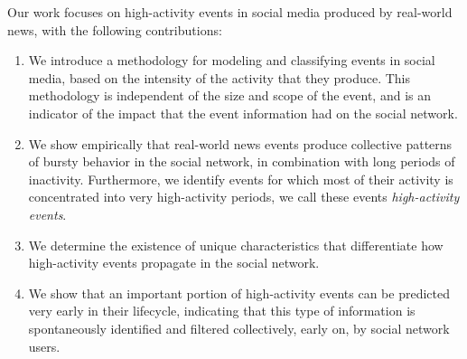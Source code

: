 \documentclass[10pt,letterpaper]{article}
\newcommand{\newtext}[1]{{\leavevmode\color{blue}#1}}
\begin{document}



Our work focuses on high-activity events in social media produced by
real-world news, with the following contributions:
\begin{enumerate}

\item We introduce a methodology for modeling and classifying
events in social media, based on the intensity of the activity that they
produce. This methodology is independent of the size and scope of the event,
and is an indicator of the impact that the event information had on the social network.

\item We show empirically that real-world news events produce collective
patterns of bursty behavior in the social network, in combination with long periods of
inactivity. Furthermore, we identify events for which most of their activity
is concentrated into very high-activity periods, we call these events {\em
high-activity events}.

\item We determine the existence of unique characteristics that
differentiate how high-activity events propagate in the social network.

\item We show that an important portion of high-activity events can be
predicted very early in their lifecycle, indicating that this type
of information is spontaneously identified and filtered collectively, early
on, by social network users.

\end{enumerate}

\end{document}
